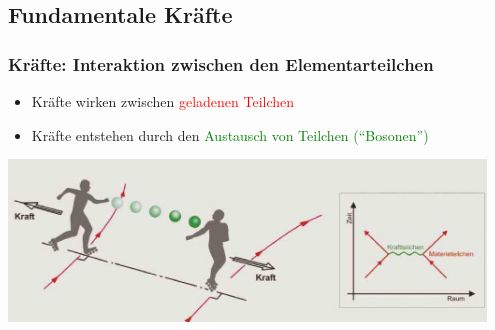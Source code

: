 \documentclass{beamer}
\begin{document}
\subsection{Fundamentale Kr\"afte}
\begin{frame}[t]
  \frametitle{Kr\"afte: Interaktion zwischen den Elementarteilchen}
  \begin{block}{}
    \begin{itemize}
    \item Kr\"afte wirken zwischen \textcolor{red}{geladenen Teilchen}
    \item Kr\"afte entstehen durch den \textcolor{green}{Austausch von
        Teilchen (``Bosonen'')}
    \end{itemize}
  \end{block}
  \begin{center}
    \includegraphics[width=0.95\textwidth]{sm/interact.jpg}
  \end{center}
\end{frame}
\end{document}
